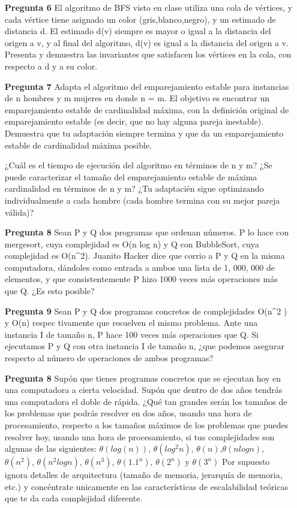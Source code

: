 \documentclass[12pt]{article}
\begin{document}
\begin{itemize}
\item[\bf{Pregunta 6}]El algoritmo de BFS visto en clase utiliza una cola de vértices, y cada vértice tiene asignado un color (gris,blanco,negro), y un estimado de distancia d. El estimado d(v) siempre es mayor o igual a la distancia del origen a v, y al final del algoritmo, d(v) es igual a la distancia del origen a v. Presenta y demuestra las invariantes que satisfacen los vértices en la cola, con respecto a d y a su color.

\item[\bf{Pregunta 7}] Adapta el algoritmo del emparejamiento estable para instancias de n hombres y m mujeres en donde n = m. El objetivo es encontrar un emparejamiento estable de cardinalidad máxima, con la definición original de emparejamiento estable (es decir, que no hay alguna pareja inestable). Demuestra que tu adaptación siempre termina y que da un emparejamiento estable de cardinalidad máxima posible.

¿Cuál es el tiempo de ejecución del algoritmo en términos de n y m?
¿Se puede caracterizar el tamaño del emparejamiento estable de máxima
cardinalidad en términos de n y m?
¿Tu adaptacién sigue optimizando individualmente a cada hombre (cada hombre termina con su mejor pareja válida)?

\item[\bf{Pregunta 8}] Sean P y Q dos programas que ordenan números. P lo hace con mergesort, cuya complejidad es O(n log n) y Q con BubbleSort, cuya complejidad es O(n^2). Juanito Hacker dice que corrio a P y Q en la misma computadora, dándoles como entrada a ambos una lista de 1, 000, 000 de elementos, y que consistentemente  P hizo 1000 veces más operaciones más que Q. ¿Es esto posible?


\item[\bf{Pregunta 9}]Sean P y Q dos programas concretos de complejidades O(n^2 ) y O(n) respec tivamente que resuelven el mismo problema. Ante una instancia I de tamaño n, P hace 100 veces más operaciones que Q. Si ejecutamos P y Q con otra instancia I de tamaño n, ¿que podemos asegurar respecto al número de operaciones de ambos programas?

\item[\bf{Pregunta 8}]Supón que tienes programas concretos que se ejecutan hoy en una computadora a cierta velocidad. Supón que dentro de dos años tendrás una computadora el doble de rápida. ¿Qué tan grandes serán los tamaños de los problemas que podrás resolver en dos años, usando una hora de procesamiento, respecto a los tamaños máximos de los problemas que puedes resolver hoy, usando una hora de procesamiento, si tus complejidades son algunas de las siguientes:
$\theta(log(n))$, $\theta(log^2 n)$, $\theta(n)$,$\theta(nlogn)$, $\theta(n^2)$, $\theta(n^2logn)$, $\theta(n^3)$, $\theta(1.1^n )$, $\theta(2^n)$ y $\theta(3^n)$ Por supuesto ignora detalles de arquitectura (tamaño de memoria, jerarquía de memoria, etc.) y concéntrate unicamente en las características de escalabilidad teóricas que te da cada complejidad diferente.

\end{itemize}
\end{document}
